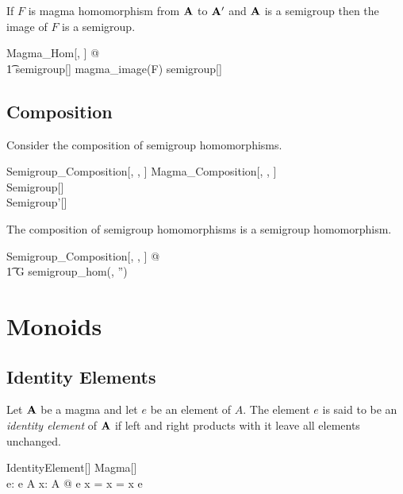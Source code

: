 \documentclass{amsart}
\begin{document}
\begin{remark}
If $F$ is magma homomorphism from $\mathbf{A}$ to $\mathbf{A}'$ and $\mathbf{A}$ is a semigroup
then the image of $F$ is a semigroup.

\begin{zed}
	\forall Magma\_Hom[\setT, \setU] @ \\
	\t1	\strucA \in semigroup[\setT] \implies magma\_image(F) \in semigroup[\setU]
\end{zed}

\end{remark}

\subsection{Composition}

Consider the composition of semigroup homomorphisms.

\begin{schema}{Semigroup\_Composition}[\genT, \genU, \genV]
	Magma\_Composition[\genT, \genU, \genV] \\
	Semigroup[\genT] \\
	Semigroup'[\genU]
\end{schema}

\begin{remark}
The composition of semigroup homomorphisms is a semigroup homomorphism.

\begin{zed}
	\forall Semigroup\_Composition[\setT, \setU, \setV] @ \\
	\t1	G \in semigroup\_hom(\strucA, \strucA'')
\end{zed}

\end{remark}

\section{Monoids}

\subsection{Identity Elements}

Let $\mathbf{A}$ be a magma and let $e$ be an element of $A$.
The element $e$ is said to be an \textit{identity element} of $\mathbf{A}$ if left and right 
products with it leave all elements unchanged.

\begin{schema}{IdentityElement}[\genT]
	Magma[\genT] \\
	e: \genT
\where
	e \in A
\also
	\forall x: A @ e \opG x = x = x \opG e
\end{schema}
\end{document}

